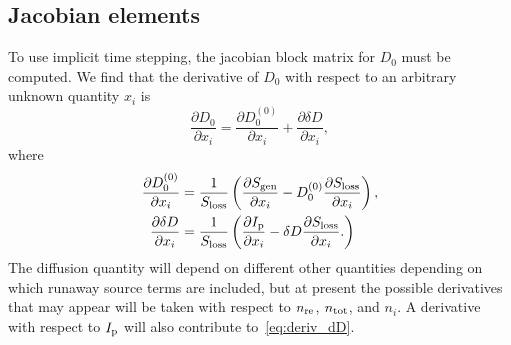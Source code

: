 \documentclass{notes}
\begin{document}
	\subsection{Jacobian elements}
	To use implicit time stepping, the jacobian block matrix for $D_0$ must be
	computed. We find that the derivative of $D_0$ with respect to an arbitrary
	unknown quantity $x_i$ is
	\begin{equation}
		\frac{\partial D_0}{\partial x_i} =
			\frac{\partial D_0^{(0)}}{\partial x_i} +
			\frac{\partial \delta D}{\partial x_i},
	\end{equation}
	where
	\begin{align}
		\frac{\partial D_0^{(0)}}{\partial x_i} &=
			\frac{1}{S_{\rm loss}}\left(
				\frac{\partial S_{\rm gen}}{\partial x_i} -
				D_0^{(0)}
				\frac{\partial S_{\rm loss}}{\partial x_i}
			\right),\\
		\frac{\partial\delta D}{\partial x_i} &=
			\frac{1}{S_{\rm loss}}\left(
				\frac{\partial I_{\rm p}}{\partial x_i}
				- \delta D
				\frac{\partial S_{\rm loss}}{\partial x_i}.
			\right)
		\label{eq:deriv_dD}
	\end{align}
	The diffusion quantity will depend on different other quantities depending
	on which runaway source terms are included, but at present the possible
	derivatives that may appear will be taken with respect to $n_{\rm re}$,
	$n_{\rm tot}$, and $n_i$. A derivative with respect to $I_{\rm p}$ will
	also contribute to~\eqref{eq:deriv_dD}.

	\appendix
\end{document}
